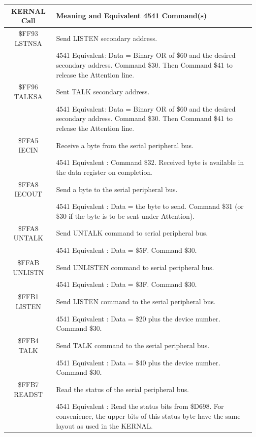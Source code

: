 \begin{center}
    \begin{longtable}{|c|L{8cm}|}
        \hline
        \textbf{KERNAL Call} & \textbf{Meaning and Equivalent 4541 Command(s)}\\
        \hline
        \endhead
        \$FF93 LSTNSA & Send LISTEN secondary address.  \\
         & 4541 Equivalent: Data = Binary OR of \$60 and the desired
        secondary address.  Command \$30. Then Command \$41 to release
        the Attention line. \\
        \hline
        \$FF96 TALKSA & Sent TALK secondary address.  \\
         & 4541 Equivalent: Data = Binary OR of \$60 and the desired
        secondary address.  Command \$30. Then Command \$41 to release
        the Attention line. \\
        \hline
        \$FFA5 IECIN & Receive a byte from the serial peripheral bus.  \\
         & 4541 Equivalent : Command \$32. Received byte is available
        in the data register on completion.  \\
        \hline
        \$FFA8 IECOUT & Send a byte to the serial peripheral bus.  \\
         & 4541 Equivalent : Data = the byte to send. Command \$31 (or \$30 if the byte is to
        be sent under Attention). \\
        \hline
        \$FFA8 UNTALK  & Send UNTALK command to serial peripheral bus.  \\
        & 4541 Equivalent : Data = \$5F. Command \$30. \\    
        \hline
        \$FFAB UNLISTN  & Send UNLISTEN command to serial peripheral bus.  \\
        & 4541 Equivalent : Data = \$3F. Command \$30. \\    
        \hline
        \$FFB1 LISTEN  & Send LISTEN command to the serial peripheral bus.  \\
        & 4541 Equivalent : Data = \$20 plus the device number. Command \$30. \\    
        \hline
        \$FFB4 TALK  & Send TALK command to the serial peripheral bus.  \\
        & 4541 Equivalent : Data = \$40 plus the device number. Command \$30. \\    
        \hline
        \$FFB7 READST & Read the status of the serial peripheral bus.  \\
        & 4541 Equivalent : Read the status bits from \$D698. For
        convenience, the
        upper bits of this status byte have the same layout as used in
        the KERNAL. \\    
        \hline
    \end{longtable}
\end{center}

